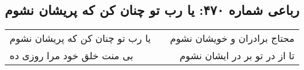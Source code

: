 \begin{center}
\section*{رباعی شماره ۴۷۰: یا رب تو چنان کن که پریشان نشوم}
\label{sec:sh470}
\begin{longtable}{l p{0.5cm} r}
یا رب تو چنان کن که پریشان نشوم
&&
محتاج برادران و خویشان نشوم
\\
بی منت خلق خود مرا روزی ده
&&
تا از در تو بر در ایشان نشوم
\\
\end{longtable}
\end{center}
